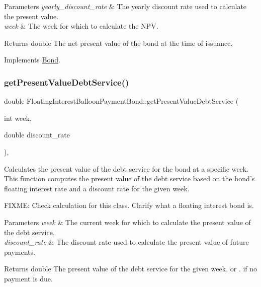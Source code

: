 \begin{DoxyParams}{Parameters}
{\em yearly\+\_\+discount\+\_\+rate} & The yearly discount rate used to calculate the present value. \\
\hline
{\em week} & The week for which to calculate the N\+PV.\\
\hline
\end{DoxyParams}
\begin{DoxyReturn}{Returns}
double The net present value of the bond at the time of issuance. 
\end{DoxyReturn}


Implements \mbox{\hyperlink{classBond_a5997278813deb16aa5d01bbca8ecc7b2}{Bond}}.

\mbox{\label{classFloatingInterestBalloonPaymentBond_a91b2fef92f90049a3ba13bcd27c0eff2}} 
\subsubsection{\texorpdfstring{get\+Present\+Value\+Debt\+Service()}{getPresentValueDebtService()}}
{\footnotesize\ttfamily double Floating\+Interest\+Balloon\+Payment\+Bond\+::get\+Present\+Value\+Debt\+Service (\begin{DoxyParamCaption}\item[{int}]{week,  }\item[{double}]{discount\+\_\+rate }\end{DoxyParamCaption})\hspace{0.3cm}{\ttfamily [override]}, {\ttfamily [virtual]}}



Calculates the present value of the debt service for the bond at a specific week. This function computes the present value of the debt service based on the bond’s floating interest rate and a discount rate for the given week. 

F\+I\+X\+ME\+: Check calculation for this class. Clarify what a floating interest bond is. 
\begin{DoxyParams}{Parameters}
{\em week} & The current week for which to calculate the present value of the debt service. \\
\hline
{\em discount\+\_\+rate} & The discount rate used to calculate the present value of future payments.\\
\hline
\end{DoxyParams}
\begin{DoxyReturn}{Returns}
double The present value of the debt service for the given week, or {.} if no payment is due.
\end{DoxyReturn}

